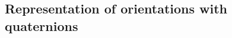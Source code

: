 

\subsection{Representation of orientations with quaternions}\label{sec:method:orientation-representation}

